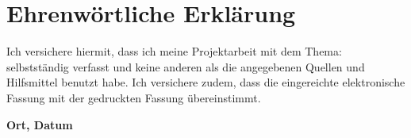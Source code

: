 
\clearpage
\chapter*{Ehrenwörtliche Erklärung}


Ich versichere hiermit, dass ich meine Projektarbeit mit dem Thema: \glqq\textit{\DerTitelDerArbeit}\grqq{} selbstständig verfasst und keine anderen als die angegebenen Quellen und Hilfsmittel benutzt habe. Ich versichere zudem, dass die eingereichte elektronische Fassung mit der gedruckten Fassung übereinstimmt.

\vspace{3cm}


\textbf{Ort, Datum} \hfill 
